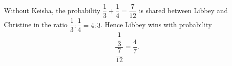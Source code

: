 Without Keisha, the probability $\dfrac{1}{3}+\dfrac{1}{4}=\dfrac{7}{12}$ is shared between Libbey and Christine in the ratio $\dfrac{1}{3}:\dfrac{1}{4}=4:3$. Hence Libbey wins with probability
\[\dfrac{\dfrac{1}{3}}{\dfrac{7}{12}}=\boxed{\dfrac{4}{7}}.\]
